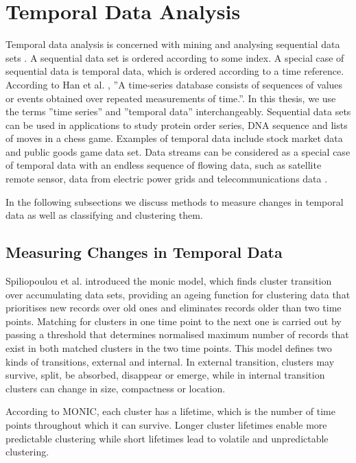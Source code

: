 \section{Temporal Data Analysis}

Temporal data analysis is concerned with mining and analysing sequential data sets \cite{Laxman2006}. A sequential data set is ordered according to some index. A special case of sequential data is temporal data, which is ordered according to a time reference. According to Han et al. \cite{Han2006}, ''A time-series database consists of sequences of values or events obtained over repeated measurements of time.''. In this thesis, we use the terms ''time series'' and ''temporal data'' interchangeably. Sequential data sets can be used in applications to study protein order series, DNA sequence and lists of moves in a chess game. Examples of temporal data include stock market data and public goods game data set. Data streams can be considered as a special case of temporal data with an endless sequence of flowing data, such as satellite remote sensor, data from electric power grids and telecommunications data \cite{Han2006}.

In the following subsections we discuss methods to measure changes in temporal data as well as classifying and clustering them.

\subsection{Measuring Changes in Temporal Data}

Spiliopoulou et al. \cite{Spiliopoulou2006} introduced the \acrshort{monic} model, which finds cluster transition over accumulating data sets, providing an ageing function for clustering data that prioritises new records over old ones and eliminates records older than two time points. Matching for clusters in one time point to the next one is carried out by passing a threshold that determines normalised maximum number of records that exist in both matched clusters in the two time points. This model defines two kinds of transitions, external and internal. In external transition, clusters may survive, split, be absorbed, disappear or emerge, while in internal transition clusters can change in size, compactness or location.

According to MONIC, each cluster has a lifetime, which is the number of time points throughout which it can survive. Longer cluster lifetimes enable more predictable clustering while short lifetimes lead to volatile and unpredictable clustering.


